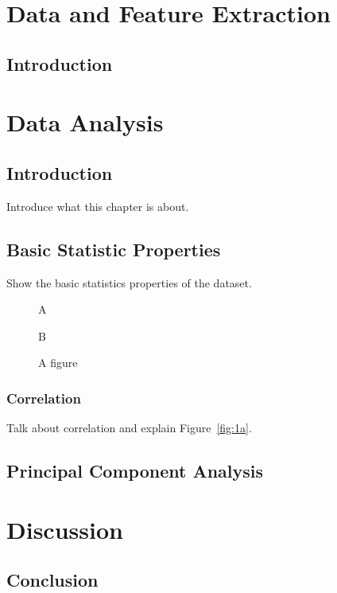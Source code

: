 \documentclass[10pt,a4paper]{report}
\newcommand{\texdir}{tex/} %
\begin{document}
\inserttitlepage

\inserttoc


\chapter{Data and Feature Extraction}
\section{Introduction}

\chapter{Data Analysis}
\section{Introduction}
Introduce what this chapter is about.
\section{Basic Statistic Properties}
Show the basic statistics properties of the dataset.
\begin{figure}[hbtp]
\begin{minipage}[b]{.45\linewidth}
\centering\large A
\label{fig:1a}
\end{minipage}%
\hfill
\begin{minipage}[b]{.45\linewidth}
\centering\large B

\label{fig:1b}
\end{minipage}
\caption{A figure}\label{fig:1}
\end{figure}

\subsection{Correlation}
Talk about correlation and explain Figure~\ref{fig:1a}.



\section{Principal Component Analysis}


\chapter{Discussion}

\section{Conclusion}
\end{document}
